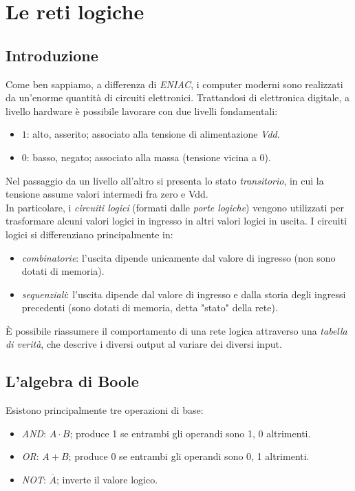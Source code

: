 \documentclass[class=book, crop=false]{standalone}
\begin{document}
\chapter{Le reti logiche}
\section{Introduzione}
Come ben sappiamo, a differenza di \emph{ENIAC}, i computer moderni sono realizzati da un'enorme quantità di circuiti elettronici. Trattandosi di elettronica digitale, a livello hardware è possibile lavorare con due livelli fondamentali:
\begin{itemize}
	\item \(1\): alto, asserito; associato alla tensione di alimentazione \emph{Vdd}.
	\item \(0\): basso, negato; associato alla massa (tensione vicina a 0).
\end{itemize}

Nel passaggio da un livello all'altro si presenta lo stato \emph{transitorio}, in cui la tensione assume valori intermedi fra zero e Vdd.\\
In particolare, i \emph{circuiti logici} (formati dalle \emph{porte logiche}) vengono utilizzati per trasformare alcuni valori logici in ingresso in altri valori logici in uscita. I circuiti logici si differenziano principalmente in:
\begin{itemize}
	\item \emph{combinatorie}: l'uscita dipende unicamente dal valore di ingresso (non sono dotati di memoria).
	\item \emph{sequenziali}: l'uscita dipende dal valore di ingresso e dalla storia degli ingressi precedenti (sono dotati di memoria, detta "stato" della rete).
\end{itemize}

\`{E} possibile riassumere il comportamento di una rete logica attraverso una \emph{tabella di verità}, che descrive i diversi output al variare dei diversi input.

\section{L'algebra di Boole}
Esistono principalmente tre operazioni di base:
\begin{itemize}
	\item \emph{AND}: \(A\cdot B\); produce 1 se entrambi gli operandi sono 1, 0 altrimenti.
	\item \emph{OR}: \(A+B\); produce 0 se entrambi gli operandi sono 0, 1 altrimenti.
	\item \emph{NOT}: \(\overline{A}\); inverte il valore logico.
\end{itemize}
\end{document}
